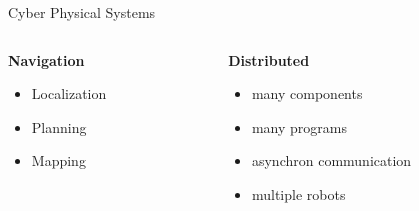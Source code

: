 \documentclass[11pt,t,usepdftitle=false,aspectratio=169]{beamer}
\begin{document}
\begin{frame}{Cyber Physical Systems}
   \begin{columns}
      \begin{column}{.455\textwidth}         
         \textbf{Navigation}
         \begin{itemize}
            \item Localization
            \item Planning
            \item Mapping
         \end{itemize}
      \end{column}
      \begin{column}{.455\textwidth}   
         \textbf{Distributed}
         \begin{itemize}
            \item many components
            \item many programs
            \item asynchron communication
            \item multiple robots
         \end{itemize}
      \end{column}
   \end{columns}
      
   \bigbreak


\end{frame}
\end{document}
